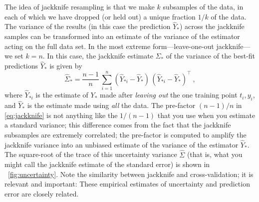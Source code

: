 \documentclass[12pt,letterpaper]{article}
\begin{document}
The idea of jackknife resampling is that we make $k$ subsamples of the data, in each of which we have dropped (or held out) a unique fraction $1/k$ of the data.
The variance of the results (in this case the prediction $\hat{Y}_\ast$) across the jackknife samples can be transformed into an estimate of the variance of the estimator acting on the full data set.
In the most extreme form---leave-one-out jackknife---we set $k=n$.
In this case, the jackknife estimate $\hat{\Sigma}_\ast$ of the variance of the best-fit predictions $\hat{Y}_\ast$ is given by
\begin{equation}\label{eq:jackknife}
    \hat{\Sigma}_\ast = \frac{n-1}{n}\,\sum_{i=1}^n (\hat{Y}_{\ast i} - \hat{Y}_\ast)\,(\hat{Y}_{\ast i} - \hat{Y}_\ast)^\top
    ~,
\end{equation}
where $\hat{Y}_{\ast i}$ is the estimate of $Y_\ast$ made after \emph{leaving out} the one training point $t_i, y_i$, and $\hat{Y}_\ast$ is the estimate made using \emph{all} the data.
The pre-factor $(n-1)/n$ in \eqref{eq:jackknife} is not anything like the $1/(n-1)$ that you use when you estimate a standard variance; this difference comes from the fact that the jackknife subsamples are extremely correlated; the pre-factor is computed to amplify the jackknife variance into an unbiased estimate of the variance of the estimator $\hat{Y}_\ast$.
The square-root of the trace of this uncertainty variance $\hat{\Sigma}$ (that is, what you might call the jackknife estimate of the standard error) is shown in \figurename~\ref{fig:uncertainty}.
Note the similarity between jackknife and cross-validation; it is relevant and important: These empirical estimates of uncertainty and prediction error are closely related.
\end{document}
